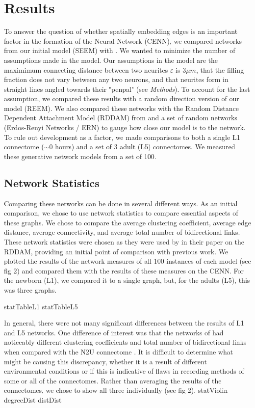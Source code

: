 \section{Results}

To answer the question of whether spatially embedding edges is an important factor in the formation of the \ce Neural Network (CENN), we compared networks from our initial model (SEEM) with \ce. 
We wanted to minimize the number of assumptions made in the model. 
Our assumptions in the model are the maximimum connecting distance between two neurites $\varepsilon$ is $3 \mu m$, that the filling fraction does not vary between any two neurons, and that neurites form in straight lines angled towards their "penpal" (see \textit{Methods}).
To account for the last assumption, we compared these results with a random direction version of our model (REEM). 
We also compared these networks with the Random Distance Dependent Attachment Model (RDDAM) from \cite{Itzhack} and a set of random networks (Erdos-Renyi Networks / ERN) to gauge how close our model is to the \ce network. 
To rule out development as a factor, we made comparisons to both a single L1 connectome ($\sim 0$ hours) and a set of 3 adult (L5) connectomes. 
We measured these generative network models from a set of 100.

\subsection{Network Statistics}
Comparing these networks can be done in several different ways. As an initial comparison, we chose to use network statistics to compare essential aspects of these graphs. We chose to compare the average clustering coefficient, average edge distance, average connectivity, and average total number of bidirectional links. These network statistics were chosen as they were used by \cite{Itzhack} in their paper on the RDDAM, providing an initial point of comparison with previous work. We plotted the results of the network measures of all 100 instances of each model (see fig 2) and compared them with the results of these measures on the CENN. For the newborn (L1), we compared it to a single graph, but, for the adults (L5), this was three graphs.

{statTableL1}
{statTableL5}  

In general, there were not many significant differences between the results of L1 and L5 networks. One difference of interest was that the networks of \cite{Witvliet} had noticeably different clustering coefficients and total number of bidirectional links when compared with the N2U connectome \citep{Durbin}.
It is difficult to determine what might be causing this discrepancy, whether it is a result of different environmental conditions or if this is indicative of flaws in recording methods of some or all of the connectomes. Rather than averaging the results of the connectomes, we chose to show all three individually (see fig 2). 
{statViolin}
{degreeDist}
{distDist}


